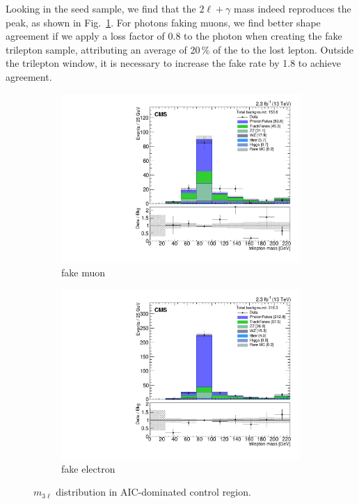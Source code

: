 Looking in the seed sample, we find that the $2\ell+\gamma$ mass indeed reproduces the \Z peak, as shown in Fig.~\ref{fig:fakeLight_AIC_MLEPTONS}. For photons faking muons, we find better shape agreement if we apply a loss factor of 0.8 to the photon \pt when creating the fake trilepton sample, attributing an average of 20\,\% of the \pt to the lost lepton. Outside the trilepton \Z window, it is necessary to increase the fake rate by 1.8 to achieve agreement.

\begin{figure}
\begin{center}
	\begin{subfigure}[b]{.7\textwidth}
		\includegraphics[width=\textwidth]{Background/bkg_fakeLight/AIC_MLIGHTLEPTONS_muFake}
		\caption{fake muon}
	\end{subfigure}
	\begin{subfigure}[b]{.7\textwidth}
		\includegraphics[width=\textwidth]{Background/bkg_fakeLight/AIC_MLIGHTLEPTONS_elFake}
		\caption{fake electron}
	\end{subfigure}
	\caption{$m_{3\ell}$ distribution in AIC-dominated control region.
	\label{fig:fakeLight_AIC_MLEPTONS}}
\end{center}
\end{figure}

